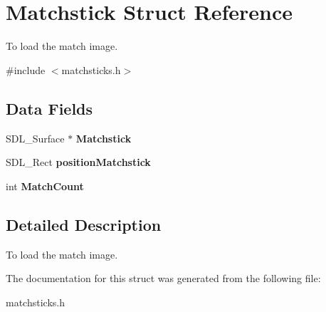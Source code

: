 \hypertarget{structMatchstick}{}\section{Matchstick Struct Reference}
\label{structMatchstick}


To load the match image.  




{\ttfamily \#include $<$matchsticks.\+h$>$}

\subsection*{Data Fields}
\begin{DoxyCompactItemize}
\item 
\mbox{\label{structMatchstick_abf32429755f84e6d66e91498255c618f}} 
S\+D\+L\+\_\+\+Surface $\ast$ {\bfseries Matchstick}
\item 
\mbox{\label{structMatchstick_a94b7cf5a0090423782617da879344d2b}} 
S\+D\+L\+\_\+\+Rect {\bfseries position\+Matchstick}
\item 
\mbox{\label{structMatchstick_a7b99dba66cb2d9fabe1c74ab96c677b2}} 
int {\bfseries Match\+Count}
\end{DoxyCompactItemize}


\subsection{Detailed Description}
To load the match image. 

The documentation for this struct was generated from the following file\+:\begin{DoxyCompactItemize}
\item 
matchsticks.\+h\end{DoxyCompactItemize}
